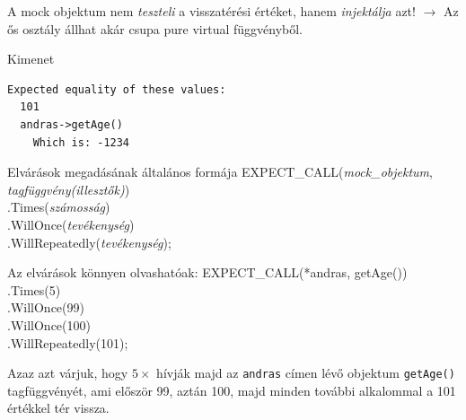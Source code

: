 \documentclass[usenames,dvipsnames,aspectratio=169]{beamer}
\begin{document}
\begin{frame}[fragile]
    A mock objektum nem \emph{teszteli} a visszatérési értéket, hanem \emph{injektálja} azt! $\to$ Az ős osztály állhat akár csupa pure virtual függvényből.
    \begin{exampleblock}{}
        \footnotesize
        
    \end{exampleblock}
    \begin{block}{Kimenet}
        \vspace{-.4cm}
        \small
        \begin{verbatim}
Expected equality of these values:
  101
  andras->getAge()
    Which is: -1234    
\end{verbatim}
        \vspace{-.4cm}
    \end{block}
\end{frame}

\begin{frame}[fragile]
    \begin{exampleblock}{Elvárások megadásának általános formája}
        \footnotesize
        EXPECT\_CALL(\emph{mock\_objektum}, \emph{tagfüggvény(illesztők)})\\
        \qquad .Times(\emph{számosság})\\
        \qquad .WillOnce(\emph{tevékenység})\\
        \qquad .WillRepeatedly(\emph{tevékenység});\\
    \end{exampleblock}
    \begin{exampleblock}{Az elvárások könnyen olvashatóak:}
        \footnotesize
        EXPECT\_CALL(*andras, getAge())\\
        \qquad .Times(5)\\
        \qquad .WillOnce(99)\\
        \qquad .WillOnce(100)\\
        \qquad .WillRepeatedly(101);\\
    \end{exampleblock}
    \footnotesize
    Azaz azt várjuk, hogy $5\times$ hívják majd az \texttt{andras} címen lévő objektum \texttt{getAge()} tagfüggvényét, 
    ami először 99, aztán 100, majd minden további alkalommal a 101 értékkel tér vissza.
\end{frame}
\end{document}
